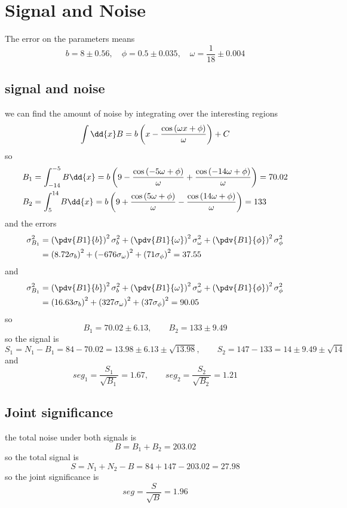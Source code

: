 \clearpage 
\section{Signal and Noise}
The error on the parameters means 
\begin{equation}
    b=8\pm0.56,\quad\phi=0.5\pm0.035,\quad\omega=\frac{1}{18}\pm0.004
\end{equation}
\subsection{signal and noise}
we can find the amount of noise by integrating over the interesting regions 
\begin{equation}
    \int\dd{x}B=b\ins{x-\frac{\cos\ins{\omega x+\phi}}{\omega}}+C
\end{equation}
so
\begin{align}
    B_1&=\int_{-14}^{-5}B\dd{x}=b\ins{9-\frac{\cos\ins{-5\omega+\phi}}{\omega}+\frac{\cos\ins{-14\omega+\phi}}{\omega}}=70.02\\
    B_2&=\int_{5}^{14}B\dd{x}=b\ins{9+\frac{\cos\ins{5\omega+\phi}}{\omega}-\frac{\cos\ins{14\omega+\phi}}{\omega}}=133
\end{align}
and the errors
\begin{align}
    \sigma_{B_1}^2&=\ins{\pdv{B1}{b}}^2\sigma_b^2+\ins{\pdv{B1}{\omega}}^2\sigma_\omega^2+\ins{\pdv{B1}{\phi}}^2\sigma_\phi^2\\
    &= \ins{8.72\sigma_b}^2+\ins{-676\sigma_\omega}^2+\ins{71\sigma_\phi}^2=37.55
\end{align}
and 
\begin{align}
    \sigma_{B_1}^2&=\ins{\pdv{B1}{b}}^2\sigma_b^2+\ins{\pdv{B1}{\omega}}^2\sigma_\omega^2+\ins{\pdv{B1}{\phi}}^2\sigma_\phi^2\\
    &= \ins{16.63\sigma_b}^2+\ins{327\sigma_\omega}^2+\ins{37\sigma_\phi}^2=90.05
\end{align}
so 
\begin{equation}
    B_1 = 70.02\pm6.13,\qquad B_2=133\pm9.49
\end{equation}
so the signal is 
\begin{equation}
    S_1 = N_1-B_1=84-70.02=13.98\pm6.13\pm\sqrt{13.98},\qquad S_2=147-133=14\pm9.49\pm\sqrt{14}
\end{equation}
and 
\begin{equation}
    seg_1=\frac{S_1}{\sqrt{B_1}}=1.67,\qquad seg_2=\frac{S_2}{\sqrt{B_2}}=1.21
\end{equation}
\subsection{Joint significance}
the total noise under both signals is 
\begin{equation}
    B = B_1+B_2=203.02
\end{equation}
so the total signal is 
\begin{equation}
    S=N_1+N_2-B=84+147-203.02=27.98
\end{equation}
so the joint significance is 
\begin{equation}
    seg=\frac{S}{\sqrt{B}}=1.96
\end{equation}
